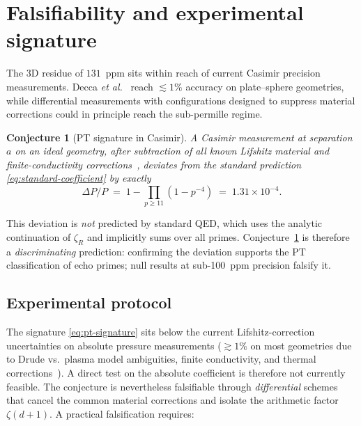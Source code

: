 \documentclass[11pt,a4paper]{article}
\newtheorem{conjecture}{Conjecture}
\newcommand{\zetaR}{\zeta_R}
\begin{document}
\section{Falsifiability and experimental signature}
\label{sec:falsifiability}

The 3D residue of $131$~ppm sits within reach of current Casimir precision measurements. Decca
\emph{et al.}~\cite{Decca2007,Decca2003} reach $\lesssim 1\%$ accuracy on plate--sphere
geometries, while differential measurements with configurations designed to suppress material
corrections could in principle reach the sub-permille regime.

\begin{conjecture}[PT signature in Casimir]
\label{conj:pt-signature}
A Casimir measurement at separation $a$ on an ideal geometry, after subtraction of all known
Lifshitz material and finite-conductivity corrections~\cite{Lifshitz1956}, deviates from the
standard prediction \eqref{eq:standard-coefficient} by exactly
\begin{equation}
\Delta P / P \;=\; 1 - \prod_{p \geq 11}(1 - p^{-4}) \;=\; 1.31 \times 10^{-4}.
\label{eq:pt-signature}
\end{equation}
\end{conjecture}

This deviation is \emph{not} predicted by standard QED, which uses the analytic continuation
of $\zetaR$ and implicitly sums over all primes.
Conjecture~\ref{conj:pt-signature} is therefore a \emph{discriminating} prediction: confirming
the deviation supports the PT classification of echo primes; null results at sub-100~ppm
precision falsify it.

\subsection{Experimental protocol}

The signature \eqref{eq:pt-signature} sits below the current Lifshitz-correction
uncertainties on absolute pressure measurements ($\gtrsim 1\%$ on most geometries due to Drude
vs.\ plasma model ambiguities, finite conductivity, and thermal corrections~\cite{Klimchitskaya2009}).
A direct test on the absolute coefficient is therefore not currently feasible.
The conjecture is nevertheless falsifiable through \emph{differential} schemes that cancel the
common material corrections and isolate the arithmetic factor $\zeta(d+1)$. A practical
falsification requires:
\end{document}
